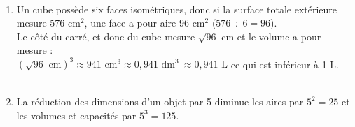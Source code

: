 \ \\ [-5mm]
\begin{enumerate}
   \item Un cube possède six faces isométriques, donc si la surface totale extérieure mesure 576 cm$^2$, une face a pour aire 96 cm$^2$ ($576\div6 =96$). \\
   Le côté du carré, et donc du cube mesure $\sqrt{96}$ cm et le volume a pour mesure : \\
   $(\sqrt{96}\text{ cm})^3 \approx 941\text{ cm}^3 \approx 0,941\text{ dm}^3 \        \approx 0,941\text{ L}$ ce qui est inférieur à 1 L. \\
    \\
   \item La réduction des dimensions d'un objet par 5 diminue les aires par $5^2 =25$ et les volumes et capacités par $5^3 =125$. \\
\end{enumerate}
